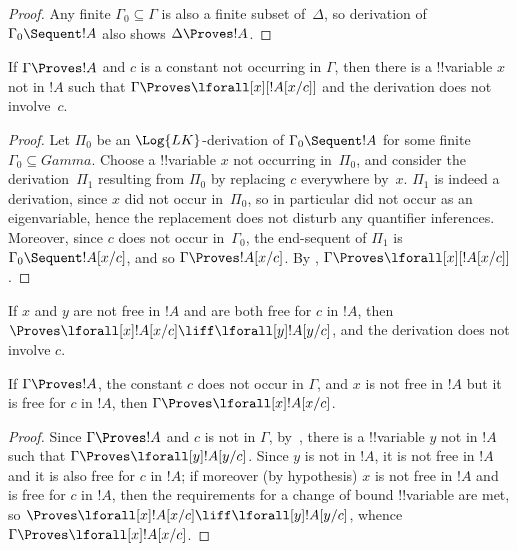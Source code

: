 \documentclass[../../include/open-logic-section]{subfiles}
\begin{document}
\begin{proof}
Any finite $\Gamma_0 \subseteq \Gamma$ is also a finite subset
of~$\Delta$, so derivation of $\Gamma_0 \Sequent !A$ also shows
$\Delta \Proves !A$.
\end{proof}

\begin{thm}
If $\Gamma \Proves !A$ and $c$ is a constant not occurring in
$\Gamma$, then there is a !!{variable} $x$ not in $!A$ such that
$\Gamma \Proves \lforall[x][!A [x/c]]$ and the derivation does not
involve~$c$.
\end{thm}

\begin{proof}
Let $\Pi_0$ be an $\Log{LK}$-derivation of $\Gamma_0 \Sequent !A$ for
some finite $\Gamma_0 \subseteq Gamma$.  Choose a !!{variable} $x$ not
occurring in~$\Pi_0$, and consider the derivation~$\Pi_1$ resulting
from $\Pi_0$ by replacing $c$ everywhere by~$x$.  $\Pi_1$ is indeed a
derivation, since $x$ did not occur in~$\Pi_0$, so in particular did
not occur as an eigenvariable, hence the replacement does not disturb
any quantifier inferences.  Moreover, since $c$ does not occur
in~$\Gamma_0$, the end-sequent of $\Pi_1$ is $\Gamma_0 \Sequent
!A[x/c]$, and so $\Gamma \Proves !A[x/c]$. By
, $\Gamma \Proves \lforall[x][!A[x/c]]$.
\end{proof}

\begin{prop}
If $x$ and $y$ are not free in $!A$ and are both free for $c$ in $!A$,
then $\Proves \lforall[x] !A[x/c] \liff \lforall[y] !A[y/c]$, and the
derivation does not involve $c$.
\end{prop}

\begin{thm}
If $\Gamma \Proves !A$, the constant $c$ does not occur in $\Gamma$,
and $x$ is not free in $!A$ but it is free for $c$ in $!A$, then
$\Gamma \Proves \lforall[x] !A[x/c]$.
\end{thm}

\begin{proof}
Since $\Gamma \Proves !A$ and $c$ is not in $\Gamma$,
by~, there is a !!{variable} $y$ not
in $!A$ such that $\Gamma \Proves \lforall[y] !A [y/c]$.  Since $y$ is
not in $!A$, it is not free in $!A$ and it is also free for $c$ in
$!A$; if moreover (by hypothesis) $x$ is not free in $!A$ and is free
for $c$ in $!A$, then the requirements for a change of bound
!!{variable} are met, so $\Proves \lforall[x] !A[x/c] \liff
\lforall[y] !A[y/c]$, whence $\Gamma \Proves \lforall[x] !A[x/c]$.
\end{proof}
\end{document}
